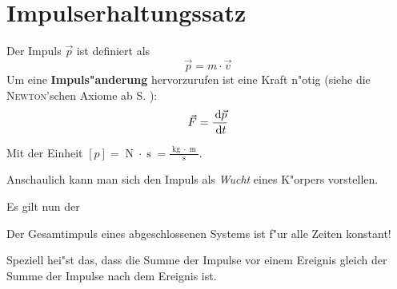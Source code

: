 \section{Impulserhaltungssatz}
\label{kap_impulserhaltungssatz}

\begin{Def}[Impuls]
   \label{def_impuls}
Der Impuls $\Vec p$ ist definiert als
\begin{equation}
   \label{eqn_def_impuls}
   \Vec p = m \cdot \Vec v
\end{equation}
Um eine \textbf{Impuls"anderung} hervorzurufen ist eine Kraft n"otig
(siehe die \textsc{Newton}'schen Axiome ab S. \pageref{kap_newton}):
\begin{equation}
   \label{eqn_zshg_impuls-kraft}
   \Vec F = \frac{\, \mathrm{d} \Vec p}{\, \mathrm{d} t}
\end{equation}
\end{Def}
Mit der Einheit $[p] = \operatorname{N} \cdot \operatorname{s} =
\frac{\operatorname{kg} \cdot \operatorname{m}}{\operatorname{s}}$.

Anschaulich kann man sich den Impuls als \emph{Wucht} eines K"orpers
vorstellen.

Es gilt nun der
\begin{Wichtig}[Impulserhaltungssatz]
   \label{def_impulserhaltungssatz}
Der Gesamtimpuls eines abgeschlossenen Systems ist f"ur alle Zeiten konstant!
\end{Wichtig}
Speziell hei"st das, dass die Summe der Impulse vor einem Ereignis
gleich der Summe der Impulse nach dem Ereignis ist.



